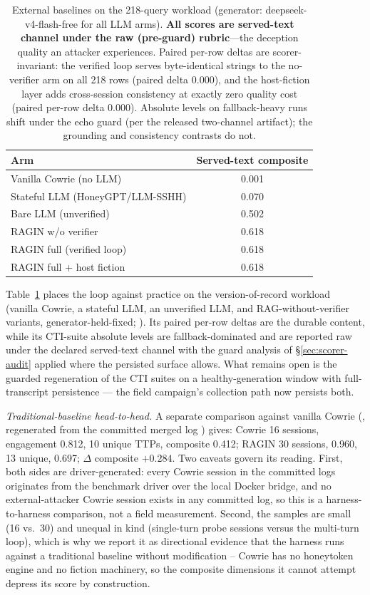 \begin{table}[t]
\centering
\caption{External baselines on the 218-query workload (generator:
deepseek-v4-flash-free for all LLM arms). \textbf{All scores are
served-text channel under the raw (pre-guard) rubric}---the deception
quality an attacker experiences. Paired per-row deltas are
scorer-invariant: the verified loop serves byte-identical strings to the
no-verifier arm on all 218 rows (paired delta 0.000), and the
host-fiction layer adds cross-session consistency at exactly zero
quality cost (paired per-row delta 0.000). Absolute levels on
fallback-heavy runs shift under the echo guard
(per the released two-channel artifact); the grounding and consistency contrasts
do not.}
\label{tab:baseline-served-text}
\begin{tabular}{lc}
\toprule
Arm & Served-text composite \\
\midrule
Vanilla Cowrie (no LLM) & 0.001 \\
Stateful LLM (HoneyGPT/LLM-SSHH) & 0.070 \\
Bare LLM (unverified) & 0.502 \\
RAGIN w/o verifier & 0.618 \\
RAGIN full (verified loop) & 0.618 \\
RAGIN full + host fiction & 0.618 \\
\bottomrule
\end{tabular}
\end{table}

Table~\ref{tab:baseline-served-text} places the loop against practice on
the version-of-record workload (vanilla Cowrie, a stateful LLM, an
unverified LLM, and RAG-without-verifier variants,
generator-held-fixed; ). Its
paired per-row deltas are the durable content, while its CTI-suite
absolute levels are fallback-dominated and are reported raw under the
declared served-text channel with the guard analysis of
\S\ref{sec:scorer-audit} applied where the persisted surface allows. What
remains open is the guarded regeneration of the CTI suites on a
healthy-generation window with full-transcript persistence --- the field
campaign's collection path now persists both.

\emph{Traditional-baseline head-to-head.} A separate comparison against
vanilla Cowrie (, regenerated from the
committed merged log ) gives:
Cowrie 16 sessions, engagement 0.812, 10 unique TTPs, composite 0.412;
RAGIN 30 sessions, 0.960, 13 unique, 0.697; $\Delta$ composite
$+0.284$. Two caveats govern its reading. First, both sides are
driver-generated: every Cowrie session in the committed logs originates
from the benchmark driver over the local Docker bridge, and no
external-attacker Cowrie session exists in any committed log, so this
is a harness-to-harness comparison, not a field measurement. Second,
the samples are small (16 vs.\ 30) and unequal in kind (single-turn
probe sessions versus the multi-turn loop), which is why we report it
as directional evidence that the harness runs against a traditional
baseline without modification -- Cowrie has no honeytoken engine and no
fiction machinery, so the composite dimensions it cannot attempt
depress its score by construction.

